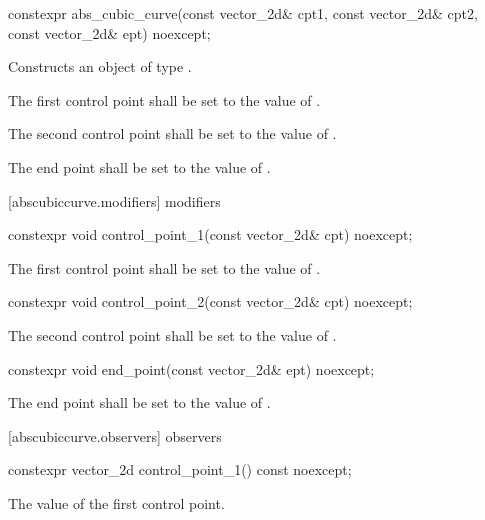 \begin{itemdecl}
constexpr abs_cubic_curve(const vector_2d& cpt1, const vector_2d& cpt2,
  const vector_2d& ept) noexcept;
\end{itemdecl}
\begin{itemdescr}
\pnum
\effects
Constructs an object of type .

\pnum
The first control point shall be set to the value of .

\pnum
The second control point shall be set to the value of .

\pnum
The end point shall be set to the value of .
\end{itemdescr}

 [abscubiccurve.modifiers]{ modifiers}

\begin{itemdecl}
constexpr void control_point_1(const vector_2d& cpt) noexcept;
\end{itemdecl}
\begin{itemdescr}
\pnum
\effects
The first control point shall be set to the value of .
\end{itemdescr}

\begin{itemdecl}
constexpr void control_point_2(const vector_2d& cpt) noexcept;
\end{itemdecl}
\begin{itemdescr}
\pnum
\effects
The second control point shall be set to the value of .
\end{itemdescr}

\begin{itemdecl}
constexpr void end_point(const vector_2d& ept) noexcept;
\end{itemdecl}
\begin{itemdescr}
\pnum
\effects
The end point shall be set to the value of .
\end{itemdescr}

 [abscubiccurve.observers]{ observers}

\begin{itemdecl}
constexpr vector_2d control_point_1() const noexcept;
\end{itemdecl}
\begin{itemdescr}
\pnum
\returns
The value of the first control point.
\end{itemdescr}

